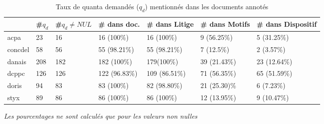 \begin{table}[!htb]
	\scriptsize  \centering
	\begin{tabular}{|l|l|l|l|l|l|l|}
		\hline
		& \textbf{\#$q_d$} & \textbf{\#$q_d\neq NUL$} & \textbf{\# dans doc.} & \textbf{\# dans Litige} & \textbf{\# dans Motifs} & \textbf{\# dans Dispositif} \\ \hline
		acpa               & 23                   & 16                                           & 16 (100\%)                   & 16 (100\%)              & 9 (56.25\%)             & 5 (31.25\%)                 \\ \hline
		concdel            & 58                   & 56                                           & 55 (98.21\%)                 & 55 (98.21\%)            & 7 (12.5\%)              & 2 (3.57\%)                  \\ \hline
		danais             & 208                  & 182                                          & 182 (100\%)                  & 179(100\%)              & 39 (21.43\%)            & 23 (12.64\%)                \\ \hline
		dcppc              & 126                  & 126                                          & 122 (96.83\%)                & 109 (86.51\%)           & 71 (56.35\%)            & 65 (51.59\%)                \\ \hline
		doris              & 94                   & 83                                           & 83 (100\%)                   & 82 (98.80\%)            & 21 (25.30)\%            & 6 (7.23\%)                  \\ \hline
		styx               & 89                   & 86                                           & 86 (100\%)                   & 86 (100\%)              & 12 (13.95\%)            & 9 (10.47\%)                 \\ \hline
	\end{tabular}

	\textit{Les pourcentages ne sont calculés que pour les valeurs non nulles}
	\caption{Taux de quanta demandés ($q_d$) mentionnés dans les documents annotés} \label{tab:quanta:mentionQd}
\end{table}

